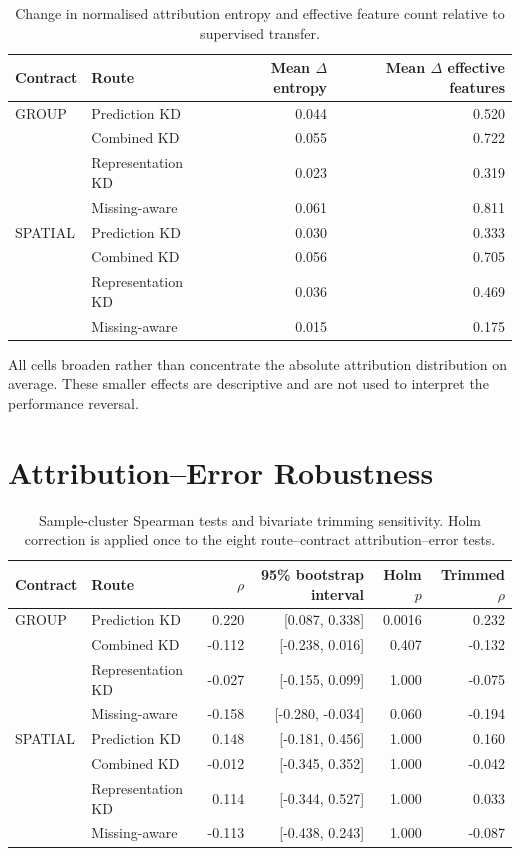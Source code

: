 \documentclass[runningheads]{venue/lncs/llncs}
\begin{document}
\begin{table}[h]
\centering
\caption{Change in normalised attribution entropy and effective feature count relative to supervised transfer.}
\small
\setlength{\tabcolsep}{4pt}
\begin{tabular}{llrr}
\toprule
Contract & Route & \shortstack{Mean $\Delta$\\entropy} & \shortstack{Mean $\Delta$\\effective features}\\
\midrule
GROUP & Prediction KD & 0.044 & 0.520\\
& Combined KD & 0.055 & 0.722\\
& Representation KD & 0.023 & 0.319\\
& Missing-aware & 0.061 & 0.811\\
\midrule
SPATIAL & Prediction KD & 0.030 & 0.333\\
& Combined KD & 0.056 & 0.705\\
& Representation KD & 0.036 & 0.469\\
& Missing-aware & 0.015 & 0.175\\
\bottomrule
\end{tabular}
\end{table}

All cells broaden rather than concentrate the absolute attribution distribution on average. These smaller effects are descriptive and are not used to interpret the performance reversal.

\section{Attribution--Error Robustness}

\begin{table}[h]
\centering
\caption{Sample-cluster Spearman tests and bivariate trimming sensitivity. Holm correction is applied once to the eight route--contract attribution--error tests.}
\small
\begin{tabular}{llrrrr}
\toprule
Contract & Route & $\rho$ & 95\% bootstrap interval & Holm $p$ & Trimmed $\rho$\\
\midrule
GROUP & Prediction KD & 0.220 & [0.087, 0.338] & 0.0016 & 0.232\\
& Combined KD & -0.112 & [-0.238, 0.016] & 0.407 & -0.132\\
& Representation KD & -0.027 & [-0.155, 0.099] & 1.000 & -0.075\\
& Missing-aware & -0.158 & [-0.280, -0.034] & 0.060 & -0.194\\
\midrule
SPATIAL & Prediction KD & 0.148 & [-0.181, 0.456] & 1.000 & 0.160\\
& Combined KD & -0.012 & [-0.345, 0.352] & 1.000 & -0.042\\
& Representation KD & 0.114 & [-0.344, 0.527] & 1.000 & 0.033\\
& Missing-aware & -0.113 & [-0.438, 0.243] & 1.000 & -0.087\\
\bottomrule
\end{tabular}
\end{table}
\end{document}
